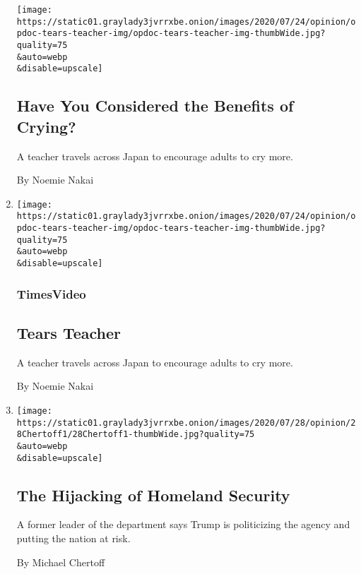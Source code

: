 \begin{enumerate}
  \texttt{[image: https://static01.graylady3jvrrxbe.onion/images/2020/07/24/opinion/opdoc-tears-teacher-img/opdoc-tears-teacher-img-thumbWide.jpg?quality=75\\\&auto=webp\\\&disable=upscale]}

  \hypertarget{have-you-considered-the-benefits-of-crying}{%
  \subsection{Have You Considered the Benefits of
  Crying?}\label{have-you-considered-the-benefits-of-crying}}

  A teacher travels across Japan to encourage adults to cry more.

  By Noemie Nakai
\item
  \href{/video/opinion/100000007247238/tears-teacher.html}{}

  \texttt{[image: https://static01.graylady3jvrrxbe.onion/images/2020/07/24/opinion/opdoc-tears-teacher-img/opdoc-tears-teacher-img-thumbWide.jpg?quality=75\\\&auto=webp\\\&disable=upscale]}

  \hypertarget{timesvideo}{%
  \subsubsection{TimesVideo}\label{timesvideo}}

  \hypertarget{tears-teacher}{%
  \subsection{Tears Teacher}\label{tears-teacher}}

  A teacher travels across Japan to encourage adults to cry more.

  By Noemie Nakai
\item
  \href{/2020/07/28/opinion/homeland-security-portland-trump.html}{}

  \texttt{[image: https://static01.graylady3jvrrxbe.onion/images/2020/07/28/opinion/28Chertoff1/28Chertoff1-thumbWide.jpg?quality=75\\\&auto=webp\\\&disable=upscale]}

  \hypertarget{the-hijacking-of-homeland-security}{%
  \subsection{The Hijacking of Homeland
  Security}\label{the-hijacking-of-homeland-security}}

  A former leader of the department says Trump is politicizing the
  agency and putting the nation at risk.

  By Michael Chertoff
\end{enumerate}

